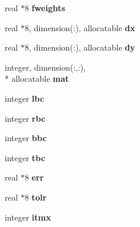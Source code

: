 \begin{DoxyCompactItemize}
\item 
\hypertarget{classinvar_a62caa28ee6cfc9246b29b2808567c112}{real $\ast$8 {\bfseries fweights}}\label{classinvar_a62caa28ee6cfc9246b29b2808567c112}

\item 
\hypertarget{classinvar_a6a89c71e56cbf68a304660d99b2d117b}{real $\ast$8, dimension(\-:), allocatable {\bfseries dx}}\label{classinvar_a6a89c71e56cbf68a304660d99b2d117b}

\item 
\hypertarget{classinvar_a204fdf570d734f509f2b291a5c118caa}{real $\ast$8, dimension(\-:), allocatable {\bfseries dy}}\label{classinvar_a204fdf570d734f509f2b291a5c118caa}

\item 
\hypertarget{classinvar_a7e75fa0b8c783ceaba90fec5c8e4c98b}{integer, dimension(\-:,\-:), \\*
allocatable {\bfseries mat}}\label{classinvar_a7e75fa0b8c783ceaba90fec5c8e4c98b}

\item 
\hypertarget{classinvar_a7852edfcc890a0c2ee575128cfded680}{integer {\bfseries lbc}}\label{classinvar_a7852edfcc890a0c2ee575128cfded680}

\item 
\hypertarget{classinvar_a861dae72d9d2fcd9ea116e650207ec18}{integer {\bfseries rbc}}\label{classinvar_a861dae72d9d2fcd9ea116e650207ec18}

\item 
\hypertarget{classinvar_a6d111f3f294d097892bd94714ac2de9b}{integer {\bfseries bbc}}\label{classinvar_a6d111f3f294d097892bd94714ac2de9b}

\item 
\hypertarget{classinvar_a0ccc322d850fbe1074cb937cde449e02}{integer {\bfseries tbc}}\label{classinvar_a0ccc322d850fbe1074cb937cde449e02}

\item 
\hypertarget{classinvar_ab909446efeb5bdca23d80d75c93731da}{real $\ast$8 {\bfseries err}}\label{classinvar_ab909446efeb5bdca23d80d75c93731da}

\item 
\hypertarget{classinvar_ab259d9aba004a4dc3064942297f86839}{real $\ast$8 {\bfseries tolr}}\label{classinvar_ab259d9aba004a4dc3064942297f86839}

\item 
\hypertarget{classinvar_aca04f7cbe921bb249c576680adbd0fd8}{integer {\bfseries itmx}}\label{classinvar_aca04f7cbe921bb249c576680adbd0fd8}


\end{DoxyCompactItemize}
